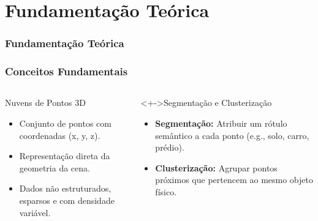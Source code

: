 \documentclass[aspectratio=169,t,xcolor=table]{beamer}
\begin{document}
\section{Fundamentação Teórica}

\begin{frame}
    \frametitle{Fundamentação Teórica}
\end{frame}

\begin{frame}
    \frametitle{Conceitos Fundamentais}
    \begin{columns}[T]
        \begin{column}{.5\textwidth}
            \begin{block}{Nuvens de Pontos 3D}
                \begin{itemize}
                    \item<+-> Conjunto de pontos com coordenadas (x, y, z).
                    \item<+-> Representação direta da geometria da cena.
                    \item<+-> Dados não estruturados, esparsos e com densidade variável.
                \end{itemize}
            \end{block}
        \end{column}
        \begin{column}{.5\textwidth}
            \begin{block}<+->{Segmentação e Clusterização}
                \begin{itemize}
                    \item<+-> \textbf{Segmentação:} Atribuir um rótulo semântico a cada ponto (e.g., solo, carro, prédio).
                    \item<+-> \textbf{Clusterização:} Agrupar pontos próximos que pertencem ao mesmo objeto físico.
                \end{itemize}
            \end{block}
        \end{column}
    \end{columns}
\end{frame}
\end{document}
